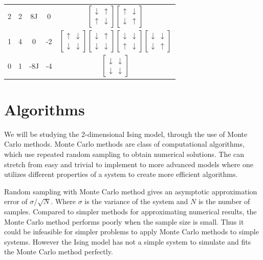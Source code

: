 \documentclass[%
reprint,
nofootinbib,
amsmath,amssymb,
aps,
]{revtex4-1}
\begin{document}
\begin{table}
\begin{tabular}{|c|c|c|c|c|}
	2 & 2 & 8J & 0&$\begin{bmatrix}\downarrow & \uparrow \\ \uparrow&\downarrow\end{bmatrix}\begin{bmatrix}\uparrow & \downarrow \\ \downarrow&\uparrow\end{bmatrix}$\\
	1 & 4 & 0 & -2&$\begin{bmatrix}\uparrow & \downarrow \\ \downarrow&\downarrow\end{bmatrix}\begin{bmatrix}\downarrow & \uparrow \\ \downarrow&\downarrow\end{bmatrix}\begin{bmatrix}\downarrow & \downarrow \\ \uparrow&\downarrow\end{bmatrix}\begin{bmatrix}\downarrow & \downarrow \\ \downarrow&\uparrow\end{bmatrix}$\\
	0 & 1 & -8J & -4&$\begin{bmatrix}\downarrow & \downarrow \\ \downarrow&\downarrow\end{bmatrix}$\\
	\hline
\end{tabular}
\end{table}


\section{Algorithms}%
We will be studying the 2-dimensional Ising model, through the use of Monte Carlo methods. Monte Carlo methods are class of computational algorithms, which use repeated random sampling to obtain numerical solutions. The can stretch from easy and trivial to implement to more advanced models where one utilizes different properties of a system to create more efficient algorithms. 

Random sampling with Monte Carlo method gives an asymptotic approximation error of $\sigma/\sqrt{N}$. Where $\sigma$ is the variance of the system and $N$ is the number of samples\cite{morten}. Compared to simpler methods for approximating numerical results, the Monte Carlo method performs poorly when the sample size is small. Thus it could be infeasible for simpler problems to apply Monte Carlo methods to simple systems. However the Ising model has not a simple system to simulate and fits the Monte Carlo method perfectly. 
\end{document}

